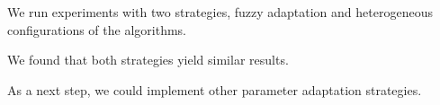 \documentclass[runningheads]{llncs}
\begin{document}
We run experiments with two strategies, fuzzy adaptation and heterogeneous configurations of the algorithms.

We found that both strategies yield similar results.

As a next step, we could implement other parameter adaptation strategies.


%
%
%


%

\end{document}
